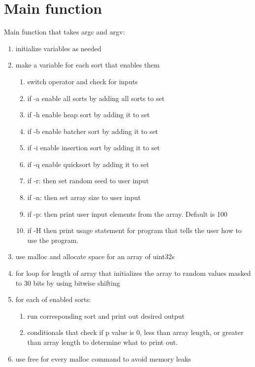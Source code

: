 \documentclass[11pt]{article}
\begin{document}
\section{Main function}\label{ss:main}
Main function that takes argc and argv:
\begin{enumerate}
\item initialize variables as needed
\item make a variable for each sort that enables them 
	\begin{enumerate}
	\item switch operator and check for inputs
	\item if -a enable all sorts by adding all sorts to set
	\item if -h enable heap sort by adding it to set
	\item if -b enable batcher sort by adding it to set
	\item if -i enable insertion sort by adding it to set
	\item if -q enable quicksort by adding it to set
	\item if -r: then set random seed to user input
	\item if -n: then set array size to user input
	\item if -p: then print user input elements from the array. Default is 100
	\item if -H then print usage statement for program that tells the user how to use the program.
	\end{enumerate}
\item use malloc and allocate space for an array of uint32s
\item for loop for length of array that initializes the array to random values masked to 30 bits by using bitwise shifting
\item for each of enabled sorts:
	\begin{enumerate}
	\item run corresponding sort and print out desired output
	\item conditionals that check if p value is 0, less than array length, or greater than array length to determine what to print out.
	\end{enumerate}
\item use free for every malloc command to avoid memory leaks
\end{enumerate}
\end{document}
